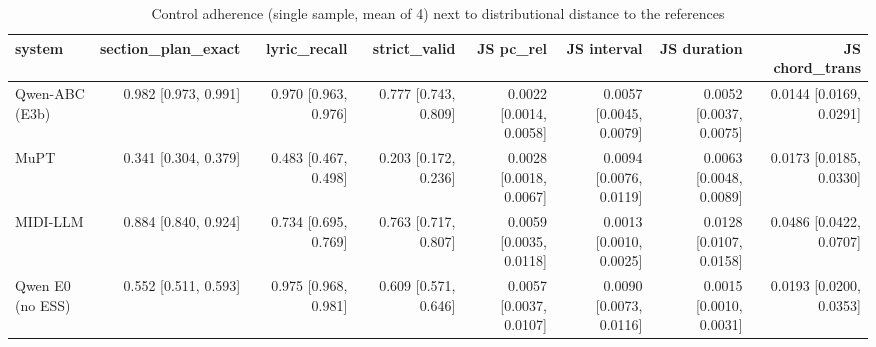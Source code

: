 \begin{table}[t]
\centering
\small
\begin{tabular}{lrrrrrrr}
\toprule
system & section\_plan\_exact & lyric\_recall & strict\_valid & JS pc\_rel & JS interval & JS duration & JS chord\_trans \\
\midrule
Qwen-ABC (E3b) & 0.982 [0.973, 0.991] & 0.970 [0.963, 0.976] & 0.777 [0.743, 0.809] & 0.0022 [0.0014, 0.0058] & 0.0057 [0.0045, 0.0079] & 0.0052 [0.0037, 0.0075] & 0.0144 [0.0169, 0.0291] \\
MuPT & 0.341 [0.304, 0.379] & 0.483 [0.467, 0.498] & 0.203 [0.172, 0.236] & 0.0028 [0.0018, 0.0067] & 0.0094 [0.0076, 0.0119] & 0.0063 [0.0048, 0.0089] & 0.0173 [0.0185, 0.0330] \\
MIDI-LLM & 0.884 [0.840, 0.924] & 0.734 [0.695, 0.769] & 0.763 [0.717, 0.807] & 0.0059 [0.0035, 0.0118] & 0.0013 [0.0010, 0.0025] & 0.0128 [0.0107, 0.0158] & 0.0486 [0.0422, 0.0707] \\
Qwen E0 (no ESS) & 0.552 [0.511, 0.593] & 0.975 [0.968, 0.981] & 0.609 [0.571, 0.646] & 0.0057 [0.0037, 0.0107] & 0.0090 [0.0073, 0.0116] & 0.0015 [0.0010, 0.0031] & 0.0193 [0.0200, 0.0353] \\
\bottomrule
\end{tabular}
\caption{Control adherence (single sample, mean of 4) next to distributional distance to the references}
\label{tab:musicality_vs_control}
\end{table}
